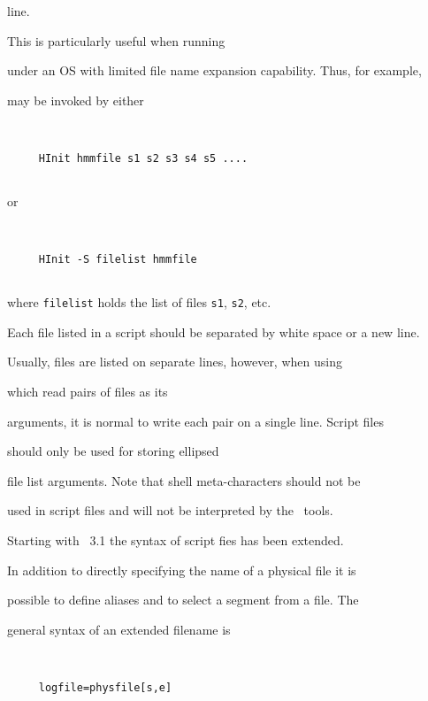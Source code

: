 line.


This is particularly useful when running


under an OS with limited file name expansion capability.  Thus, for example,


 may be invoked by either


\begin{verbatim}


     HInit hmmfile s1 s2 s3 s4 s5 ....


\end{verbatim}  


or


\begin{verbatim}


     HInit -S filelist hmmfile


\end{verbatim}          


where \texttt{filelist} holds the list of files \texttt{s1}, \texttt{s2}, etc.


Each file listed in a script should be separated by white space or a new line.


Usually, files are listed on separate lines, however, when using


 which read pairs of files as its


arguments, it is normal to write each pair on a single line.  Script files


should only be used for storing ellipsed


file list arguments. Note that shell meta-characters should not be


used in script files and will not be interpreted by the \HTK\ tools.





Starting with \HTK\ 3.1 the syntax of script fies has been extended.


In addition to directly specifying the name of a physical file it is


possible to define aliases and to select a segment from a file. The


general syntax of an extended filename  is


\begin{verbatim}


     logfile=physfile[s,e]   


\end{verbatim}


